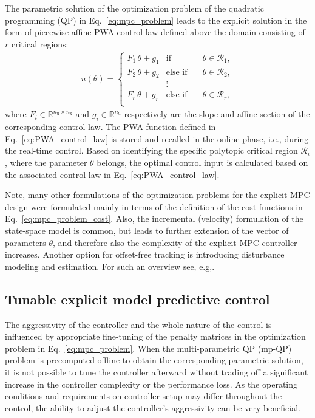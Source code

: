 \documentclass[preprint,12pt]{elsarticle}
\begin{document}
	The parametric solution of the optimization problem of the quadratic programming (QP) in Eq.~\eqref{eq:mpc_problem} leads to the explicit solution in the form of piecewise affine PWA control law defined above the domain consisting of $r$ critical regions:
	\begin{eqnarray}
		\label{eq:PWA_control_law}
		u(\theta) = \left\{ 
		\begin{matrix}
			F_{1} \, \theta + g_{1} & \mathrm{if} & \quad \theta \in \mathcal{R}_1, \\
			F_{2} \, \theta + g_{2} & \mathrm{else}\,\,\mathrm{if} &\quad \theta \in \mathcal{R}_2, \\
			& \vdots & \\
			F_{r} \, \theta + g_{r} & \mathrm{else}\,\,\mathrm{if} & \quad \theta \in \mathcal{R}_{r}, \\
		\end{matrix}
		\right.
	\end{eqnarray}
	where $F_{i} \in \mathbb{R}^{n_{\mathrm{u}} \times n_{\mathrm{x}}}$ and $g_{i}  \in \mathbb{R}^{n_{\mathrm{u}}}$ respectively are the slope and affine section of the corresponding control law. The PWA function defined in Eq.~\eqref{eq:PWA_control_law} is stored and recalled in the online phase, i.e., during the real-time control. Based on identifying the specific polytopic critical region $\mathcal{R}_{i}$, where the parameter $\theta$ belongs, the optimal control input is calculated based on the associated control law in Eq.~\eqref{eq:PWA_control_law}.
	
	Note, many other formulations of the optimization problems for the explicit MPC design were formulated mainly in terms of the definition of the cost functions in Eq.~\eqref{eq:mpc_problem_cost}. Also, the incremental (velocity) formulation of the state-space model is common, but leads to further extension of the vector of parameters $\theta$, and therefore also the complexity of the explicit MPC controller increases. Another option for offset-free tracking is introducing disturbance modeling and estimation. For such an overview see, e.g,.~\cite{Klauco_mpc} 
	
	
	\subsection{Tunable explicit model predictive control}
	\label{sec:tunable}
	
	The aggressivity of the controller and the whole nature of the control is influenced by appropriate fine-tuning of the penalty matrices in the optimization problem in Eq.~\eqref{eq:mpc_problem}. When the multi-parametric QP (mp-QP) problem is precomputed offline to obtain the corresponding parametric solution, it is not possible to tune the controller afterward without trading off a significant increase in the controller complexity or the performance loss. As the operating conditions and requirements on controller setup may differ throughout the control, the ability to adjust the controller's aggressivity can be very beneficial.
	
\end{document}
